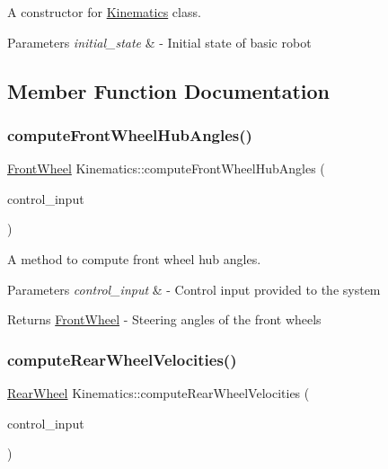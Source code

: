 A constructor for \hyperlink{classKinematics}{Kinematics} class. 


\begin{DoxyParams}{Parameters}
{\em initial\+\_\+state} & -\/ Initial state of basic robot \\
\hline
\end{DoxyParams}


\subsection{Member Function Documentation}
\mbox{\label{classKinematics_af5e5528ca44f82edae99025410595a36}} 
\subsubsection{\texorpdfstring{compute\+Front\+Wheel\+Hub\+Angles()}{computeFrontWheelHubAngles()}}
{\footnotesize\ttfamily \hyperlink{structFrontWheel}{Front\+Wheel} Kinematics\+::compute\+Front\+Wheel\+Hub\+Angles (\begin{DoxyParamCaption}\item[{const ackermann\+\_\+msgs\+::\+Ackermann\+Drive\+Stamped \&}]{control\+\_\+input }\end{DoxyParamCaption})}



A method to compute front wheel hub angles. 


\begin{DoxyParams}{Parameters}
{\em control\+\_\+input} & -\/ Control input provided to the system \\
\hline
\end{DoxyParams}
\begin{DoxyReturn}{Returns}
\hyperlink{structFrontWheel}{Front\+Wheel} -\/ Steering angles of the front wheels 
\end{DoxyReturn}
\mbox{\label{classKinematics_ac2733720e49bcd20662e74ea9334a878}} 
\subsubsection{\texorpdfstring{compute\+Rear\+Wheel\+Velocities()}{computeRearWheelVelocities()}}
{\footnotesize\ttfamily \hyperlink{structRearWheel}{Rear\+Wheel} Kinematics\+::compute\+Rear\+Wheel\+Velocities (\begin{DoxyParamCaption}\item[{const ackermann\+\_\+msgs\+::\+Ackermann\+Drive\+Stamped \&}]{control\+\_\+input }\end{DoxyParamCaption})}




